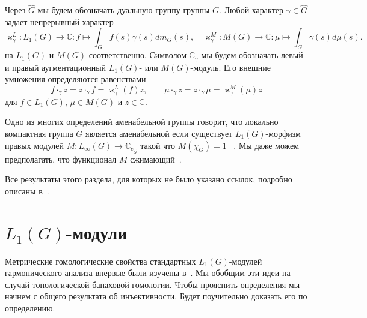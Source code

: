 \documentclass{article}
\numberwithin{equation}{section}
\theoremstyle{plain}
\theoremstyle{definition}
\begin{document}
\begin{fulltext}
Через $\widehat{G}$ мы будем обозначать дуальную группу группы $G$. Любой
характер $\gamma\in\widehat{G}$ задает непрерывный характер  
\[
\varkappa_\gamma^L
:L_1(G)\to\mathbb{C}
:f\mapsto \int_G f(s)\overline{\gamma(s)}d m_G(s),
\quad
\varkappa_\gamma^M
:M(G)\to\mathbb{C}
:\mu\mapsto\int_{G} \overline{\gamma(s)}d\mu(s).
\]
на $L_1(G)$ и $M(G)$ соответственно. Символом $\mathbb{C}_\gamma$ мы будем
обозначать левый и правый аугментационный $L_1(G)$- или $M(G)$-модуль. Его
внешние умножения определяются равенствами
\[
f\cdot_{\gamma}z=z\cdot_{\gamma}f=\varkappa_\gamma^L(f)z,
\qquad
\mu\cdot_{\gamma}z=z\cdot_{\gamma}\mu=\varkappa_\gamma^M(\mu)z
\]
для $f\in L_1(G)$, $\mu\in M(G)$ и $z\in\mathbb{C}$. 

Одно из многих определений аменабельной группы говорит, что локально компактная
группа $G$ является аменабельной если существует $L_1(G)$-морфизм правых модулей
$M:L_\infty(G)\to\mathbb{C}_{e_{\widehat{G}}}$ такой что $M(\chi_G)=1$
~\cite[раздел~VII.2.5]{HelBanLocConvAlg}. Мы даже можем предполагать, что
функционал $M$ сжимающий~\cite[замечание~VII.1.54]{HelBanLocConvAlg}.

Все результаты этого раздела, для которых не было указано ссылок, подробно
описаны в~\cite[раздел~3.3]{DalBanAlgAutCont}.


\section{\texorpdfstring{$L_1(G)$}{L1(G)}-модули}\label{SubSectionL1GModules}

Метрические гомологические свойства стандартных $L_1(G)$-модулей гармонического
анализа впервые были изучены в~\cite{GravInjProjBanMod}. Мы обобщим эти идеи на
случай топологической банаховой гомологии. Чтобы прояснить определения мы начнем
с общего результата об инъективности. Будет поучительно доказать его по
определению.


\end{fulltext}
\end{document}
